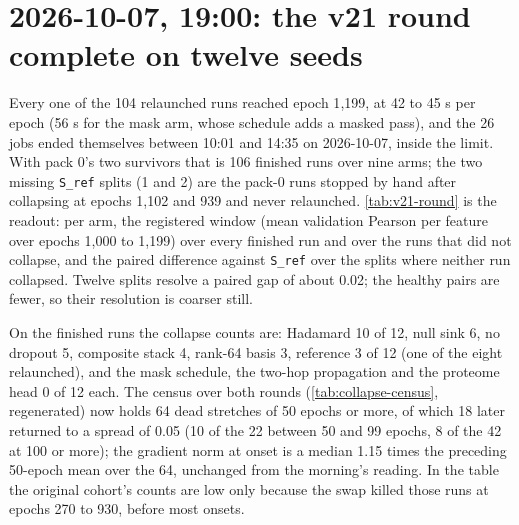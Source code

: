 
\clearpage
\section{2026-10-07, 19:00: the v21 round complete on twelve seeds}
\label{sec:round-complete}

 Every one of the 104 relaunched runs reached epoch
1{,}199, at 42 to 45 s per epoch (56 s for the mask arm, whose schedule adds a masked pass),
and the 26 jobs ended themselves between 10:01 and 14:35 on 2026-10-07, inside the limit.
With pack 0's two survivors that is 106 finished runs over nine arms; the two missing
\texttt{S\_ref} splits (1 and 2) are the pack-0 runs stopped by hand after collapsing at
epochs 1{,}102 and 939 and never relaunched. \cref{tab:v21-round} is the readout:
per arm, the registered window (mean validation Pearson per feature over epochs 1{,}000 to
1{,}199) over every finished run and over the runs that did not collapse, and the paired
difference against \texttt{S\_ref} over the splits where neither run collapsed. Twelve
splits resolve a paired gap of about 0.02; the healthy pairs are fewer, so their resolution
is coarser still.



 On the finished runs the collapse
counts are: Hadamard 10 of 12, null sink 6, no dropout 5, composite stack 4, rank-64 basis
3, reference 3 of 12 (one of the eight relaunched), and the mask schedule, the two-hop
propagation and the proteome head 0 of 12 each. The census over both rounds
(\cref{tab:collapse-census}, regenerated) now holds 64 dead stretches of 50 epochs or more,
of which 18 later returned to a spread of 0.05 (10 of the 22 between 50 and 99 epochs, 8 of
the 42 at 100 or more); the gradient norm at onset is a median 1.15 times the preceding
50-epoch mean over the 64, unchanged from the morning's reading. In the table the original
cohort's counts are low only because the swap killed those runs at epochs 270 to 930, before
most onsets.

